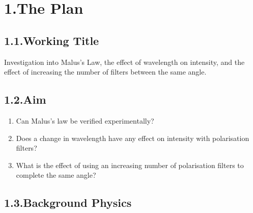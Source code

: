 \documentclass{article}
\begin{document}
\mdxtitleblockstart{}
\mdxauthorstart{}
\mdxauthorend\mdtitleauthorrunning{}{}\mdxtitleblockend%

\section{1.\hspace*{0.5em}The Plan}\label{sec-the-plan}%

\subsection{1.1.\hspace*{0.5em}Working Title}\label{sec-working-title}%

\noindent{}Investigation into Malus's Law, the effect of wavelength on intensity, and the effect of increasing the number of filters between the same angle.%

\subsection{1.2.\hspace*{0.5em}Aim}\label{sec-aim}%

\begin{enumerate}[noitemsep,topsep=\mdcompacttopsep]%

\item{}Can Malus’s law be verified experimentally?%

\item{}Does a change in wavelength have any effect on intensity with polarisation filters?%

\item{}What is the effect of using an increasing number of polarisation filters to complete the same angle?%
\end{enumerate}%

\subsection{1.3.\hspace*{0.5em}Background Physics}\label{sec-background-physics}%
\end{document}

